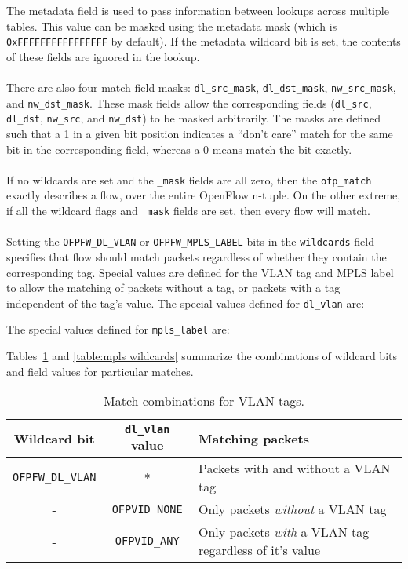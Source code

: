 The metadata field is used to pass information between lookups across multiple tables. This value can be masked using the metadata mask (which is \verb|0xFFFFFFFFFFFFFFFF| by default). If the metadata wildcard bit is set, the contents of these fields are ignored in the lookup.
\\\\
There are also four match field masks: \verb|dl_src_mask|, \verb|dl_dst_mask|, \verb|nw_src_mask|, and \verb|nw_dst_mask|. These mask fields allow the corresponding fields (\verb|dl_src|, \verb|dl_dst|, \verb|nw_src|, and \verb|nw_dst|) to be masked arbitrarily. The masks are defined such that a 1 in a given bit position indicates a ``don't care'' match for the same bit in the corresponding field, whereas a 0 means match the bit exactly.
\\\\
If no wildcards are set and the \verb|_mask| fields are all zero, then the \verb|ofp_match| exactly describes a flow, over the entire OpenFlow n-tuple.  On the other extreme, if all the wildcard flags and \verb|_mask| fields are set, then every flow will match.
\\\\
Setting the \verb|OFPFW_DL_VLAN| or \verb|OFPFW_MPLS_LABEL| bits in the \verb|wildcards| field specifies that flow should match packets regardless of whether they contain the corresponding tag. Special values are defined for the VLAN tag and MPLS label to allow the matching of packets without a tag, or packets with a tag independent of the tag's value. The special values defined for \verb|dl_vlan| are:

The special values defined for \verb|mpls_label| are:

Tables~\ref{table:vlan wildcards} and \ref{table:mpls wildcards} summarize the combinations of wildcard bits and field values for particular matches.

\begin{table}[hbp]
\centering
\begin{tabularx}{\textwidth}{|c|c|X|}
\hline
Wildcard bit & \verb|dl_vlan| value & Matching packets \\
\hline
\verb|OFPFW_DL_VLAN| & * & Packets with and without a VLAN tag \\
\hline
- & \verb|OFPVID_NONE| & Only packets \emph{without} a VLAN tag \\
\hline
- & \verb|OFPVID_ANY| & Only packets \emph{with} a VLAN tag regardless of it's value \\
\hline
\end{tabularx}
\caption{Match combinations for VLAN tags.}
\label{table:vlan wildcards}
\end{table}

